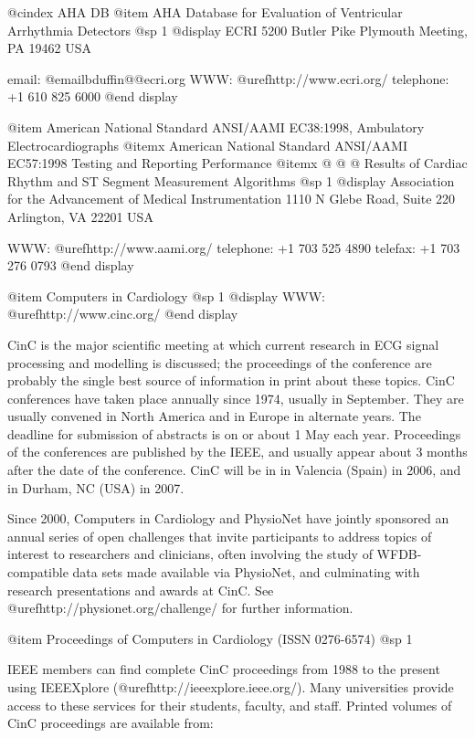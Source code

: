 {{{{{{{{{@cindex AHA DB
@item AHA Database for Evaluation of Ventricular Arrhythmia Detectors
@sp 1
@display
ECRI
5200 Butler Pike
Plymouth Meeting, PA 19462 USA

email: @email{bduffin@@ecri.org}
WWW: @uref{http://www.ecri.org/}
telephone: +1 610 825 6000
@end display

@item American National Standard ANSI/AAMI EC38:1998, Ambulatory Electrocardiographs
@itemx American National Standard ANSI/AAMI EC57:1998 Testing and Reporting Performance
@itemx @ @ @ Results of Cardiac Rhythm and ST Segment Measurement Algorithms
@sp 1
@display
Association for the Advancement of Medical Instrumentation
1110 N Glebe Road, Suite 220
Arlington, VA 22201 USA

WWW: @uref{http://www.aami.org/}
telephone: +1 703 525 4890
telefax: +1 703 276 0793
@end display

@item Computers in Cardiology
@sp 1
@display
WWW: @uref{http://www.cinc.org/}
@end display

CinC is the major scientific meeting at which current research in ECG signal
processing and modelling is discussed; the proceedings of the conference are
probably the single best source of information in print about these topics.
CinC conferences have taken place annually since 1974, usually in September.
They are usually convened in North America and in Europe in alternate years.
The deadline for submission of abstracts is on or about 1 May each year.
Proceedings of the conferences are published by the IEEE, and usually
appear about 3 months after the date of the conference.  CinC will be in
in Valencia (Spain) in 2006, and in Durham, NC (USA) in 2007.

Since 2000, Computers in Cardiology and PhysioNet have jointly sponsored
an annual series of open challenges that invite participants to address
topics of interest to researchers and clinicians, often involving the
study of WFDB-compatible data sets made available via PhysioNet, and
culminating with research presentations and awards at CinC.  See
@uref{http://physionet.org/challenge/} for further information.

@item Proceedings of Computers in Cardiology (ISSN 0276-6574)
@sp 1

IEEE members can find complete CinC proceedings from 1988 to the
present using IEEEXplore (@uref{http://ieeexplore.ieee.org/}). Many
universities provide access to these services for their students, faculty, and
staff.  Printed volumes of CinC proceedings are available from:

}}}}}}}}}
